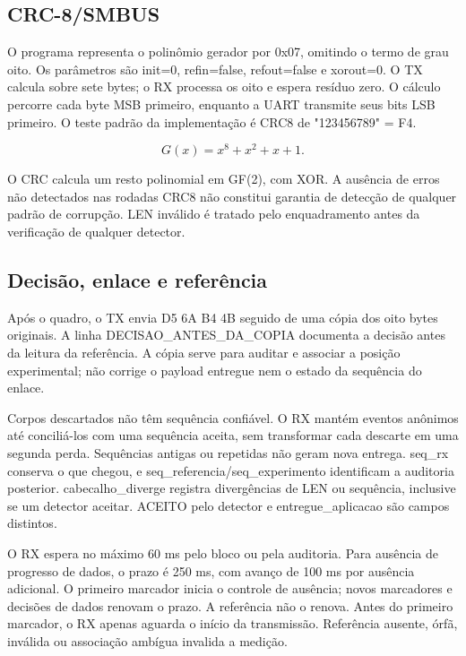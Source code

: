 \documentclass[12pt,a4paper]{article}
\begin{document}
\subsection{CRC-8/SMBUS}

O programa representa o polinômio gerador por 0x07, omitindo o termo de grau oito. Os parâmetros são init=0, refin=false, refout=false e xorout=0. O TX calcula sobre sete bytes; o RX processa os oito e espera resíduo zero. O cálculo percorre cada byte MSB primeiro, enquanto a UART transmite seus bits LSB primeiro. O teste padrão da implementação é CRC8 de "123456789" = F4.\par

\begin{equation}G(x)=x^8+x^2+x+1.\end{equation}

O CRC calcula um resto polinomial em GF(2), com XOR. A ausência de erros não detectados nas rodadas CRC8 não constitui garantia de detecção de qualquer padrão de corrupção. LEN inválido é tratado pelo enquadramento antes da verificação de qualquer detector.\par

\subsection{Decisão, enlace e referência}

Após o quadro, o TX envia D5 6A B4 4B seguido de uma cópia dos oito bytes originais. A linha DECISAO\_ANTES\_DA\_COPIA documenta a decisão antes da leitura da referência. A cópia serve para auditar e associar a posição experimental; não corrige o payload entregue nem o estado da sequência do enlace.\par

Corpos descartados não têm sequência confiável. O RX mantém eventos anônimos até conciliá-los com uma sequência aceita, sem transformar cada descarte em uma segunda perda. Sequências antigas ou repetidas não geram nova entrega. seq\_rx conserva o que chegou, e seq\_referencia/seq\_experimento identificam a auditoria posterior. cabecalho\_diverge registra divergências de LEN ou sequência, inclusive se um detector aceitar. ACEITO pelo detector e entregue\_aplicacao são campos distintos.\par

O RX espera no máximo 60 ms pelo bloco ou pela auditoria. Para ausência de progresso de dados, o prazo é 250 ms, com avanço de 100 ms por ausência adicional. O primeiro marcador inicia o controle de ausência; novos marcadores e decisões de dados renovam o prazo. A referência não o renova. Antes do primeiro marcador, o RX apenas aguarda o início da transmissão. Referência ausente, órfã, inválida ou associação ambígua invalida a medição.\par
\end{document}
